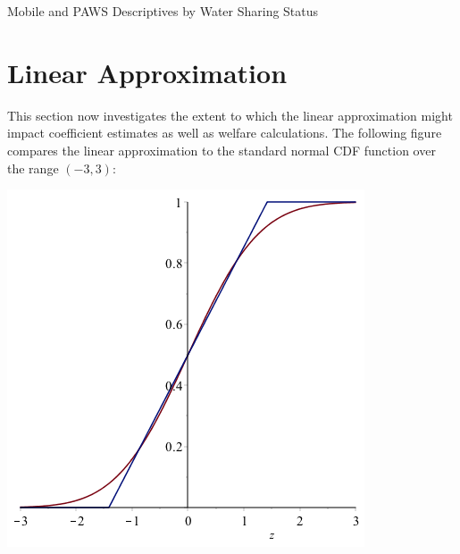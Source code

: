 \documentclass[12pt]{article}
\begin{document}
\begin{appendices}


\begin{table}
\centering
\caption{Mobile and PAWS Descriptives by Water Sharing Status}\label{table:pollfishpawssharing}

\end{table}


\section{Linear Approximation}\label{appendix:linearapprox}

This section now investigates the extent to which the linear approximation might impact coefficient estimates as well as welfare calculations.  The following figure compares the linear approximation to the standard normal CDF function over the range $(-3,3)$:
\begin{center}
\includegraphics[scale=.5]{tables/cdf_approx.png}
\end{center}

\end{appendices}
\end{document}
